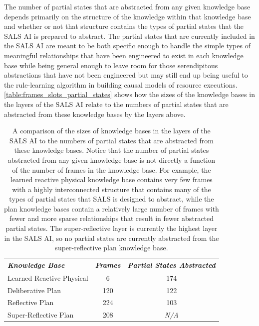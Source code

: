 The number of partial states that are abstracted from any given
knowledge base depends primarily on the structure of the knowledge
within that knowledge base and whether or not that structure contains
the types of partial states that the SALS AI is prepared to abstract.
The partial states that are currently included in the SALS AI are
meant to be both specific enough to handle the simple types of
meaningful relationships that have been engineered to exist in each
knowledge base while being general enough to leave room for those
serendipitous abstractions that have not been engineered but may still
end up being useful to the rule-learning algorithm in building causal
models of resource executions.
{\mbox{\autoref{table:frames_slots_partial_states}}} shows how the
sizes of the knowledge bases in the layers of the SALS AI relate to
the numbers of partial states that are abstracted from these knowledge
bases by the layers above.
\begin{table}
\centering
\begin{tabular}{|l|c|c|}
\hline
\emph{Knowledge Base}     & \emph{Frames} & \emph{Partial States Abstracted} \\
\hline
Learned Reactive Physical & 6             & 174                              \\
\hline
Deliberative Plan         & 120           & 122                              \\
\hline
Reflective Plan           & 224           & 103                              \\
\hline
Super-Reflective Plan     & 208           & {\scriptsize{\emph{N/A}}}        \\
\hline
\end{tabular}
\caption[A comparison of the sizes of knowledge bases in the layers of
  the SALS AI to the numbers of partial states that are abstracted
  from these knowledge bases.]{A comparison of the sizes of knowledge
  bases in the layers of the SALS AI to the numbers of partial states
  that are abstracted from these knowledge bases.  Notice that the
  number of partial states abstracted from any given knowledge base is
  not directly a function of the number of frames in the knowledge
  base.  For example, the learned reactive physical knowledge base
  contains very few frames with a highly interconnected structure that
  contains many of the types of partial states that SALS is designed
  to abstract, while the plan knowledge bases contain a relatively
  large number of frames with fewer and more sparse relationships that
  result in fewer abstracted partial states.  The super-reflective
  layer is currently the highest layer in the SALS AI, so no partial
  states are currently abstracted from the super-reflective plan
  knowledge base.}
\label{table:frames_slots_partial_states}
\end{table}
